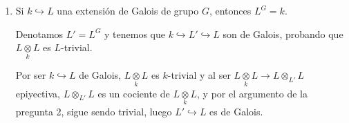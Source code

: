 \begin{enumerate}
\begin{dem}
        Tensorializando la sucesi\'on por $\underset{k}{\otimes} E_2$
        $$\bt 0 \rar & E^G\underset{k}{\otimes} E_2 \rar & E\underset{k}{\otimes} E_2 \rar{\Phi\otimes 1} & (E \times \cdots \times E)\underset{k}{\otimes} E_2  \simeq &[-12mm] (E\underset{k}{\otimes} E_2) \times \cdots \times (E\underset{k}{\otimes} E_2) \et$$
        luego $\ker(\Phi\otimes 1) = $ invariantes de $E\underset{k}{\otimes} E_2 = (E\underset{k}{\otimes} E_2)^G$. Pero por ser exacta la sucesi\'on, $\ker (\Phi\otimes 1) = E^G\underset{k}{\otimes} E_2$, hemos calculado $\ker (\Phi \otimes 1)$ de dos formas, es decir, que $E^G\underset{k}{\otimes} E_2 = (E\underset{k}{\otimes} E_2)^G$. En nuestro caso, como $L$ es cuerpo conteniendo a $k$ es espacio vectorial.
    \end{dem}
    \item Si $k \hookrightarrow L$ una extensi\'on de Galois de grupo $G$, entonces $L^G = k$.
    \begin{dem}
        Denotamos $L'=L^G$ y tenemos que $k \hookrightarrow L' \hookrightarrow L$ son de Galois, probando que $L\underset{k}{\otimes} L$ es $L$-trivial.

        Por ser $k \hookrightarrow L$ de Galois, $L \underset{k}{\otimes} L$ es $k$-trivial y al ser $L \underset{k}{\otimes} L\longrightarrow L \otimes_{L'} L$ epiyectiva, $L \otimes_{L'} L$ es un cociente de $L \underset{k}{\otimes} L$, y por el argumento de la pregunta 2, sigue sendo trivial, luego $L'\hookrightarrow L$ es de Galois.


\end{dem}
\end{enumerate}
